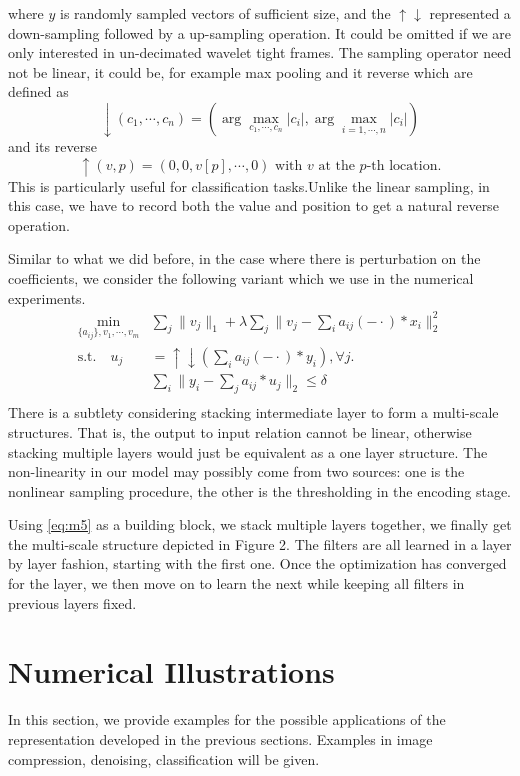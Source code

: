 \documentclass[a4paper]{article}
\begin{document}
where $y$ is randomly sampled vectors of sufficient size, and the $\uparrow \downarrow$ represented a down-sampling followed by a up-sampling operation. It could be omitted if we are only interested in un-decimated wavelet tight frames. The sampling operator need not be linear, it could be, for example max pooling and it reverse which are defined as 
\[
\downarrow(c_1,\cdots,c_n) = (\arg\max_{c_1,\cdots,c_n} |c_i|, \arg\max_{i=1,\cdots,n} |c_i|)
\]
and its reverse
\[
\uparrow(v,p)=(0,0,v[p],\cdots,0) \textrm{ with $v$ at the $p$-th location}.
\]
This is particularly useful for classification tasks.Unlike the linear sampling, in this case, we have to record both the value and position to get a natural reverse operation.

Similar to what we did before, in the case where there is perturbation on the coefficients, we consider the following variant which we use in the numerical experiments.
\begin{equation}
\label{eq:m5}
\begin{aligned}
\min_{\{a_{ij}\}, v_1,\cdots,v_m}& \sum_j \|v_j\|_1 + \lambda \sum_j \|v_j-  \sum_{i} a_{ij}(-\cdot)*x_i \|_2^2\\
 \textrm{s.t.}  	\quad 	u_j&=\uparrow\downarrow(\sum_i a_{ij}(-\cdot)*y_i), \forall j.\\
&\sum_i \|y_i - \sum_j a_{ij}*u_j\|_2  \leq \delta\\
\end{aligned}
\end{equation}
There is a subtlety considering stacking intermediate layer to form a multi-scale structures. That is, the output to input relation cannot be linear, otherwise stacking multiple layers would just be equivalent as a one layer structure. The non-linearity in our model may possibly come from two sources: one is the nonlinear sampling procedure, the other is the thresholding in the encoding stage.

Using \eqref{eq:m5} as a building block, we stack multiple layers together, we finally get the multi-scale structure depicted in Figure 2. The filters are all learned in a  layer by layer fashion, starting with the first one. Once the optimization has converged for the layer, we then move on to learn the next while keeping all filters in previous layers fixed. 

\section{Numerical Illustrations}
In this section, we provide examples for the possible applications of the representation developed in the previous sections. Examples in image compression, denoising, classification will be given. 
\end{document}

